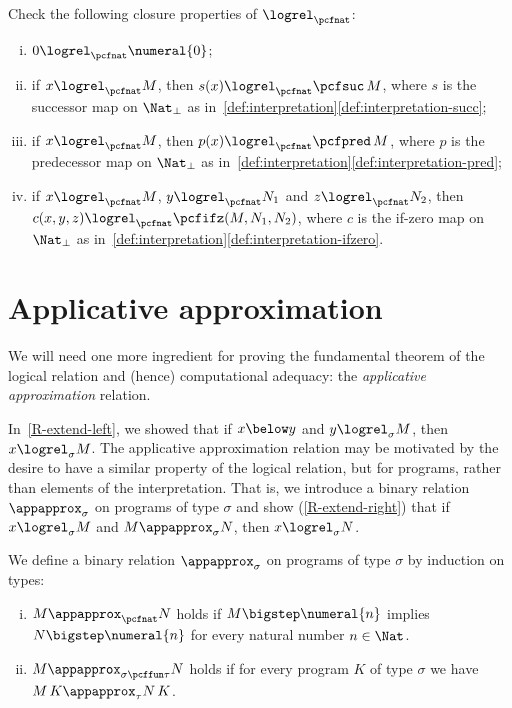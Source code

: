 \begin{exercise}\label{exer:closure-under-basic-operations}
  Check the following closure properties of \(\logrel_\pcfnat\):
  \begin{enumerate}[(i)]
  \item \(0 \logrel_\pcfnat \numeral{0}\);
  \item if \(x \logrel_\pcfnat M\), then \(s(x) \logrel_\pcfnat \pcfsuc\, M\),
    where \(s\) is the successor map on \(\Nat_\bot\) as
    in~\cref{def:interpretation}\ref{def:interpretation-succ};
  \item if \(x \logrel_\pcfnat M\), then \(p(x) \logrel_\pcfnat \pcfpred\, M\),
    where \(p\) is the predecessor map on \(\Nat_\bot\) as
    in~\cref{def:interpretation}\ref{def:interpretation-pred};
  \item if \(x \logrel_\pcfnat M\), \(y \logrel_\pcfnat N_1\) and
    \(z \logrel_\pcfnat N_2\), then
    \(c(x,y,z) \logrel_\pcfnat \pcfifz(M,N_1,N_2)\), where \(c\) is the if-zero
    map on \(\Nat_\bot\) as
    in~\cref{def:interpretation}\ref{def:interpretation-ifzero}. \qedhere
  \end{enumerate}
\end{exercise}

\section{Applicative approximation}

We will need one more ingredient for proving the fundamental theorem of the
logical relation and (hence) computational adequacy: the \emph{applicative
  approximation} relation.

In~\cref{R-extend-left}, we showed that if \(x \below y\) and
\(y \logrel_\sigma M\), then \(x \logrel_\sigma M\).
%
The applicative approximation relation may be motivated by the desire to have a
similar property of the logical relation, but for programs, rather than elements
of the interpretation. That is, we introduce a binary relation
\(\appapprox_\sigma\) on programs of type \(\sigma\) and show
(\cref{R-extend-right}) that if \(x \logrel_\sigma M\) and
\(M \appapprox_\sigma N\), then \(x \logrel_\sigma N\).

\begin{definition}
  We define a binary relation \(\appapprox_\sigma\) on programs of type
  \(\sigma\) by induction on types:
  \begin{enumerate}[(i)]
  \item \(M \appapprox_\pcfnat N\) holds if \(M \bigstep \numeral{n}\) implies
    \(N \bigstep \numeral{n}\) for every natural number \(n\in\Nat\).
  \item \(M \appapprox_{\sigma \pcffun \tau} N\) holds if for every program
    \(K\) of type \(\sigma\) we have \(M \, K \appapprox_\tau N \, K\). \qedhere
  \end{enumerate}
\end{definition}

